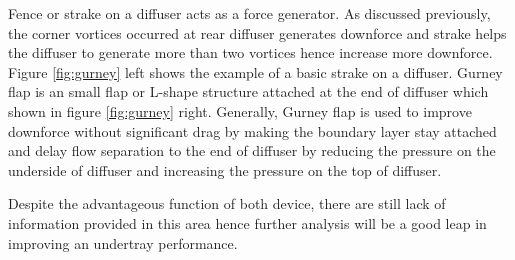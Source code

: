\noindent Fence or strake on a diffuser acts as a force generator. As discussed previously, the corner vortices occurred at rear diffuser generates downforce and strake helps the diffuser to generate more than two vortices hence increase more downforce. Figure \ref{fig:gurney} left shows the example of a basic strake on a diffuser. Gurney flap is an small flap or L-shape structure attached at the end of diffuser which shown in figure \ref{fig:gurney} right. Generally, Gurney flap is used to improve downforce without significant drag \cite{Willemsen2012CFD-basedDiffuser} by making the boundary layer stay attached and delay flow separation to the end of diffuser by reducing the pressure on the underside of diffuser and increasing the pressure on the top of diffuser. 

\noindent Despite the advantageous function of both device, there are still lack of information provided in this area hence further analysis will be a good leap in improving an undertray performance.  
